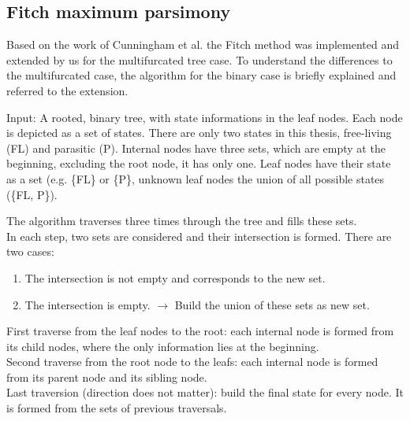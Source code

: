     \subsection{Fitch maximum parsimony}
      Based on the work of Cunningham et al. \cite{Cunningham1998} the Fitch method \cite{Fitch1971} 
        was implemented and extended by us for the multifurcated tree case. To understand the 
        differences to the multifurcated case, the algorithm for the binary case is briefly explained 
        and referred to the extension.

      Input: A rooted, binary tree, with state informations in the leaf nodes. Each node is depicted as 
        a set of states. There are only two states in this thesis, free-living (FL) and parasitic (P). 
        Internal nodes have three sets, which are empty at the beginning, excluding the root node, it 
        has only one. Leaf nodes have their state as a set (e.g. \{FL\} or \{P\}, unknown leaf nodes the 
        union of all possible states (\{FL, P\}).

      The algorithm traverses three times through the tree and fills these sets. \\
      In each step, two sets are considered and their intersection is formed. There are two cases:
      \begin{enumerate}
        \item The intersection is not empty and corresponds to the new set.
        \item The intersection is empty. $\rightarrow$ Build the union of these sets as new set.
      \end{enumerate}
      First traverse from the leaf nodes to the root: each internal node is formed from its child nodes, 
        where the only information lies at the beginning. \\
      Second traverse from the root node to the leafs: each internal node is formed from its parent node 
        and its sibling node. \\
      Last traversion (direction does not matter): build the final state for every node. It is formed 
        from the sets of previous traversals.

